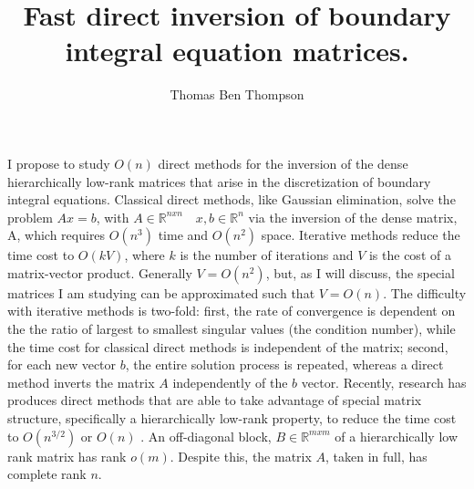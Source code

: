 \documentclass[a4paper]{article}
\author{Thomas Ben Thompson}
\title{Fast direct inversion of boundary integral equation matrices.}
\date{}
\newcommand{\R}{\mathbb{R}}
\begin{document}
\maketitle

I propose to study $O(n)$ direct methods for the inversion of the dense hierarchically low-rank matrices that arise in the discretization of boundary integral equations. Classical direct methods, like Gaussian elimination, solve the problem $Ax = b$, with $A \in \R^{nxn} \quad x,b \in \R^n$ via the inversion of the dense matrix, A, which requires $O(n^3)$ time and $O(n^2)$ space. Iterative methods reduce the time cost to $O(kV)$, where $k$ is the number of iterations and $V$ is the cost of a matrix-vector product. Generally $V = O(n^2)$, but, as I will discuss, the special matrices I am studying can be approximated such that $V = O(n)$. The difficulty with iterative methods is two-fold: first, the rate of convergence is dependent on the the ratio of largest to smallest singular values (the condition number), while the time cost for classical direct methods is independent of the matrix; second, for each new vector $b$, the entire solution process is repeated, whereas a direct method inverts the matrix $A$ independently of the $b$ vector. Recently, research has produces direct methods that are able to take advantage of special matrix structure, specifically a hierarchically low-rank property, to reduce the time cost to $O(n^{3/2})$ or $O(n)$ \citep{Martinsson2005, Greengard2009, Ambikasaran2014}. An off-diagonal block, $B \in \R^{mxm}$ of a hierarchically low rank matrix has rank $o(m)$. Despite this, the matrix $A$, taken in full, has complete rank $n$. 
\end{document}
